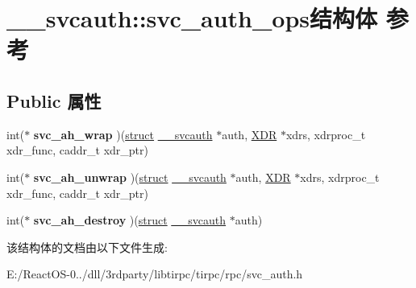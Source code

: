 \hypertarget{struct____svcauth_1_1svc__auth__ops}{}\section{\+\_\+\+\_\+svcauth\+:\+:svc\+\_\+auth\+\_\+ops结构体 参考}
\label{struct____svcauth_1_1svc__auth__ops}
\subsection*{Public 属性}
\begin{DoxyCompactItemize}
\item 
\mbox{\label{struct____svcauth_1_1svc__auth__ops_a0e3c78ece91830d6d925c1eb2123a363}} 
int($\ast$ {\bfseries svc\+\_\+ah\+\_\+wrap} )(\hyperlink{interfacestruct}{struct} \hyperlink{struct____svcauth}{\+\_\+\+\_\+svcauth} $\ast$auth, \hyperlink{struct____rpc__xdr}{X\+DR} $\ast$xdrs, xdrproc\+\_\+t xdr\+\_\+func, caddr\+\_\+t xdr\+\_\+ptr)
\item 
\mbox{\label{struct____svcauth_1_1svc__auth__ops_a81ead4175fc4af257d52922994547589}} 
int($\ast$ {\bfseries svc\+\_\+ah\+\_\+unwrap} )(\hyperlink{interfacestruct}{struct} \hyperlink{struct____svcauth}{\+\_\+\+\_\+svcauth} $\ast$auth, \hyperlink{struct____rpc__xdr}{X\+DR} $\ast$xdrs, xdrproc\+\_\+t xdr\+\_\+func, caddr\+\_\+t xdr\+\_\+ptr)
\item 
\mbox{\label{struct____svcauth_1_1svc__auth__ops_a240166b0987f67896f2b8c7d11599099}} 
int($\ast$ {\bfseries svc\+\_\+ah\+\_\+destroy} )(\hyperlink{interfacestruct}{struct} \hyperlink{struct____svcauth}{\+\_\+\+\_\+svcauth} $\ast$auth)
\end{DoxyCompactItemize}


该结构体的文档由以下文件生成\+:\begin{DoxyCompactItemize}
\item 
E\+:/\+React\+O\+S-\/0../dll/3rdparty/libtirpc/tirpc/rpc/svc\+\_\+auth.\+h\end{DoxyCompactItemize}
